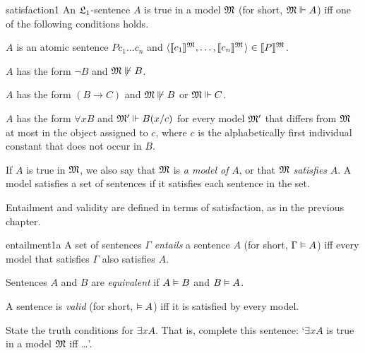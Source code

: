 
\begin{definition}{}{satisfaction1}
  An $\mathfrak{L}_{1}$-sentence $A$ is true in a model $\mathfrak{M}$ (for short, $\mathfrak{M} \Vdash A$)
  iff one of the following conditions holds.
  \begin{cenumerate}
    \item[(i)] $A$ is an atomic sentence $Pc_{1}\ldots c_{n}$ and
      $\t{\llbracket c_{1} \rrbracket^{\Mod{M}}, \ldots, \llbracket c_{n} \rrbracket^{\Mod{M}}} \in \llbracket P \rrbracket^{\Mod{M}}$.
    \item[(ii)] $A$ has the form $\neg B$ and $\mathfrak{M} \not\Vdash B$.
    \item[(iii)] $A$ has the form $(B \to C)$ and $\mathfrak{M} \not\Vdash B$ or $\mathfrak{M} \Vdash C$.
    \item[(iv)] $A$ has the form $\forall x B$ and $\mathfrak{M}' \Vdash B(x/c)$ for every
      model $\mathfrak{M}'$ that differs from $\mathfrak{M}$ at most in the object assigned to $c$,
      where $c$ is the alphabetically first individual constant that does not occur in $B$.
  \end{cenumerate}
\end{definition}
%
\noindent%
If $A$ is true in $\mathfrak{M}$,
we also say that $\mathfrak{M}$ is \emph{a model of} $A$,
or that $\mathfrak{M}$ \emph{satisfies} $A$.
A model satisfies a set of sentences if it satisfies each sentence in the set.

Entailment and validity are defined in terms of satisfaction,
as in the previous chapter.

\begin{definition}{}{entailment1a}
  A set of sentences $\Gamma$ \emph{entails} a sentence $A$
  (for short, $\Gamma \vDash A$)
  iff every model that satisfies $\Gamma$ also satisfies $A$.

  Sentences $A$ and $B$ are \emph{equivalent} if $A \vDash B$ and $B \vDash A$.

  A sentence is \emph{valid} (for short, $\vDash A$) iff it is satisfied by every model.
\end{definition}

\begin{exercise}
  State the truth conditions for $\exists x A$.
  That is, complete this sentence:
  `$\exists x A$ is true in a model $\mathfrak{M}$ iff \ldots'.
\end{exercise}

